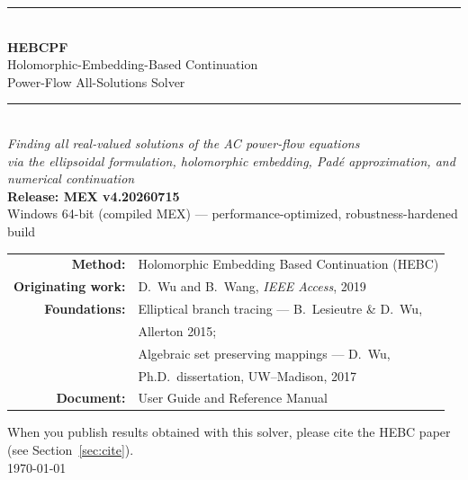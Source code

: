\documentclass[11pt,a4paper]{article}
\begin{document}
\begin{titlepage}
\centering
\vspace*{2.2cm}
{\color{rule}\rule{\textwidth}{1.2pt}}\\[8pt]
{\Huge\bfseries HEBCPF}\\[10pt]
{\LARGE Holomorphic-Embedding-Based Continuation}\\[4pt]
{\LARGE Power-Flow All-Solutions Solver}\\[10pt]
{\color{rule}\rule{\textwidth}{1.2pt}}\\[18pt]
{\large\itshape Finding \emph{all} real-valued solutions of the AC power-flow equations}\\[6pt]
{\large\itshape via the ellipsoidal formulation, holomorphic embedding, Pad\'e approximation, and numerical continuation}\\[26pt]

{\large\bfseries Release: MEX v4.20260715}\\[4pt]
{\large Windows 64-bit (compiled MEX) --- performance-optimized, robustness-hardened build}\\[30pt]

\begin{tabular}{rl}
\textbf{Method:} & Holomorphic Embedding Based Continuation (HEBC)\\[3pt]
\textbf{Originating work:} & D.\ Wu and B.\ Wang, \emph{IEEE Access}, 2019\\[6pt]
\textbf{Foundations:} & Elliptical branch tracing --- B.\ Lesieutre \& D.\ Wu,\\[1pt]
                      & Allerton 2015;\\[3pt]
                      & Algebraic set preserving mappings --- D.\ Wu,\\[1pt]
                      & Ph.D.\ dissertation, UW--Madison, 2017\\[6pt]
\textbf{Document:} & User Guide and Reference Manual\\
\end{tabular}

\vfill
{\small When you publish results obtained with this solver, please cite the HEBC
paper (see Section~\ref{sec:cite}).}\\[6pt]
{\small\today}
\end{titlepage}

\clearpage
{}
\tableofcontents
\newpage

\end{document}
